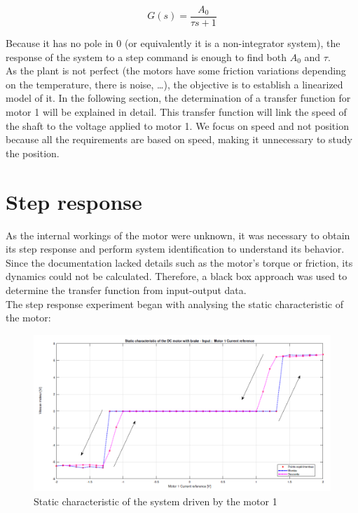 \begin{equation}
    G(s) = \frac{A_0}{\tau s + 1}
    \label{eq:1_st_order_TF}
\end{equation}

Because it has no pole in $0$ (or equivalently it is a non-integrator system), the response of the system to a step
command is enough to find both $A_0$ and $\tau$.\\

As the plant is not perfect (the motors have some friction variations depending on the temperature, there is noise, \dots), the objective is to establish a linearized model of it. 
In the following section, the determination of a transfer function for motor 1 will be explained in detail. 
This transfer function will link the speed of the shaft to the voltage applied to motor 1. 
We focus on speed and not position because all the requirements are based on speed, making it unnecessary to study the position.\\

\section{Step response}

As the internal workings of the motor were unknown, it was necessary to obtain its step response and perform system identification to understand its behavior. 
Since the documentation lacked details such as the motor's torque or friction, its dynamics could not be calculated. 
Therefore, a black box approach was used to determine the transfer function from input-output data.\\

The step response experiment began with analysing the static characteristic of the motor:

\begin{figure}[H]
    \centering
    \includegraphics[width=\textwidth]{Pictures/static_characteristic_motor_1.png}
    \caption{Static characteristic of the system driven by the motor 1}
    \label{fig:static_characteristic_motor_1}
\end{figure}

